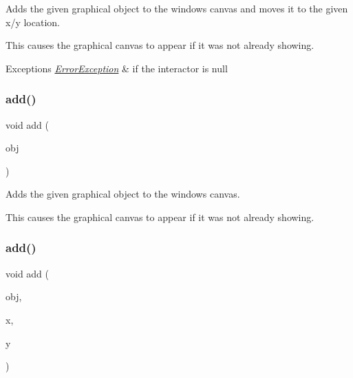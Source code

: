 Adds the given graphical object to the window\textquotesingle{}s canvas and moves it to the given x/y location. 

This causes the graphical canvas to appear if it was not already showing. 
\begin{DoxyExceptions}{Exceptions}
{\em \mbox{\hyperlink{classErrorException}{Error\+Exception}}} & if the interactor is null \\
\hline
\end{DoxyExceptions}
\mbox{\label{classGWindow_a7f596867e2d8f9dfb816b3d496ea074f}} 
\subsubsection{\texorpdfstring{add()}{add()}\hspace{0.1cm}{\footnotesize\ttfamily [7/8]}}
{\footnotesize\ttfamily void add (\begin{DoxyParamCaption}\item[{\mbox{\hyperlink{classGObject}{G\+Object}} \&}]{obj }\end{DoxyParamCaption})\hspace{0.3cm}{\ttfamily [virtual]}}



Adds the given graphical object to the window\textquotesingle{}s canvas. 

This causes the graphical canvas to appear if it was not already showing. \mbox{\label{classGWindow_ac302bb932e3905e5d368ce735ad8444c}} 
\subsubsection{\texorpdfstring{add()}{add()}\hspace{0.1cm}{\footnotesize\ttfamily [8/8]}}
{\footnotesize\ttfamily void add (\begin{DoxyParamCaption}\item[{\mbox{\hyperlink{classGObject}{G\+Object}} \&}]{obj,  }\item[{double}]{x,  }\item[{double}]{y }\end{DoxyParamCaption})\hspace{0.3cm}{\ttfamily [virtual]}}



